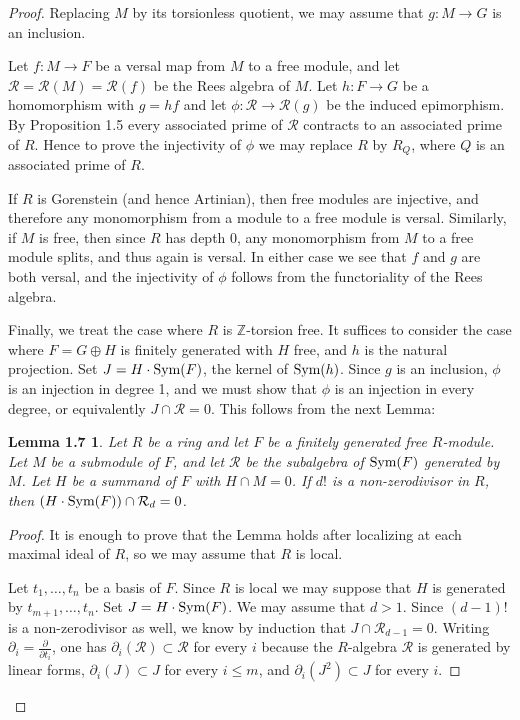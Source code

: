\documentclass{proc-l}
\theoremstyle{plain}
\newtheorem*{theorem6}{Lemma 1.7}
\theoremstyle{definition}
\newcommand{\R}{\mathcal R}
\newcommand{\Sym}{\hbox {\rm Sym}}
\begin{document}
\begin{proof} Replacing $M$ by its torsionless quotient,
we may assume that $g \colon M\to G$ is an inclusion.

Let $f \colon M \to F$ be a versal map from $M$ to a free module, and let
$\R =\R (M)=\R (f)$ be the Rees algebra of $M$. Let $h \colon F\to G$ be a
homomorphism with $g=hf$ and let $\phi \colon \R \to \R (g)$ be the induced
epimorphism. By Proposition 1.5 every associated prime of $\R $ contracts
to an associated prime of $R$. Hence to prove the injectivity 
of $\phi $ we may replace $R$
by $R_{Q}$, where $Q$ is an associated prime of $R$.

If $R$ is Gorenstein (and hence Artinian), then free modules are
injective, and therefore any monomorphism from a module to a free
module is versal.  Similarly, if $M$ is free, then since $R$ has
depth 0, any monomorphism from $M$ to a free module splits, and
thus again is versal. In either case we see that $f$ and $g$ are
both versal, and the injectivity of $\phi $ follows from the
functoriality of the Rees algebra.

Finally, we treat the case where $R$ is ${\mathbb{Z}}$-torsion free.
It suffices to consider the case where $F = G \oplus H$ is
finitely generated with $H$ free, and $h$ is the natural
projection. Set $J=H\cdot \Sym (F)$, the kernel of $\Sym (h)$. Since
$g$ is an inclusion,  $\phi $ is an injection in degree 1, and we
must show that $\phi $ is an injection in every degree, or
equivalently $J\cap \R =0$. This follows from the next Lemma:


\begin{theorem6}  Let $R$ be a ring  and let $F$ be a finitely
generated free $R$-module. Let $M$ be a submodule of $F$, and let
$\R $ be the subalgebra of $\Sym (F)$ generated by $M$. Let $H$ be a
summand of $F$ with $H\cap M=0$. If $d!$ is a non-zerodivisor in
$R$, then $(H\cdot \Sym (F))\cap \R _{d}=0$.
\end{theorem6}


\begin{proof} It is enough to prove that the Lemma holds after
localizing at each maximal ideal of $R$, so we may assume that $R$
is local.

Let $t_{1},\dots ,t_{n}$ be a basis of $F$. Since $R$ is local we may
suppose that $H$ is generated by $t_{m+1},\dots ,t_{n}$.  Set
$J=H\cdot \Sym (F)$.  We may assume that $d > 1$.  Since $(d-1)!$
is a non-zerodivisor as well, we know by induction that $J \cap \R _{d-1} = 0$.  Writing $\partial _{i} = \frac{\partial }{\partial t_{i}}$, one has $\partial _{i} (\R ) \subset \R $ for every $i$ because
the $R$-algebra $\R $ is generated by linear forms, $\partial _{i}(J)
\subset J$ for every $i \le m$, and $\partial _{i}(J^{2}) \subset J$
for every $i$.


\end{proof}
\end{proof}
\end{document}
